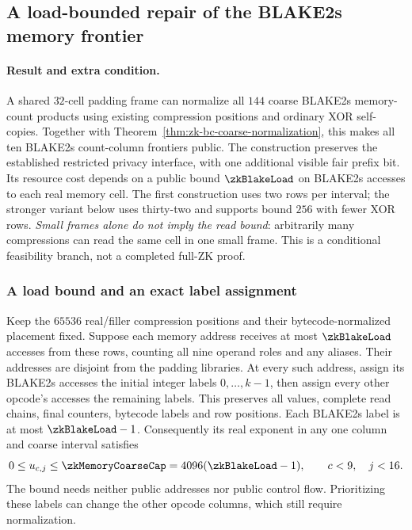 \subsection{A load-bounded repair of the BLAKE2s memory frontier}\label{note:zk-memory-count-coarse}

\paragraph{Result and extra condition.} A shared $32$-cell padding frame can normalize all $144$ coarse BLAKE2s memory-count products using existing compression positions and ordinary XOR self-copies. Together with Theorem~\ref{thm:zk-bc-coarse-normalization}, this makes all ten BLAKE2s count-column frontiers public. The construction preserves the established restricted privacy interface, with one additional visible fair prefix bit. Its resource cost depends on a public bound $\zkBlakeLoad$ on BLAKE2s accesses to each real memory cell. The first construction uses two rows per interval; the stronger variant below uses thirty-two and supports bound $256$ with fewer XOR rows. \emph{Small frames alone do not imply the read bound}: arbitrarily many compressions can read the same cell in one small frame. This is a conditional feasibility branch, not a completed full-ZK proof.

\subsubsection{A load bound and an exact label assignment}

Keep the $65536$ real/filler compression positions and their bytecode-normalized placement fixed. Suppose each memory address receives at most $\zkBlakeLoad$ accesses from these rows, counting all nine operand roles and any aliases. Their addresses are disjoint from the padding libraries. At every such address, assign its BLAKE2s accesses the initial integer labels $0,\ldots,k-1$, then assign every other opcode's accesses the remaining labels. This preserves all values, complete read chains, final counters, bytecode labels and row positions. Each BLAKE2s label is at most $\zkBlakeLoad-1$. Consequently its real exponent in any one column and coarse interval satisfies
\[
 0\le u_{c,j}\le\zkMemoryCoarseCap=4096(\zkBlakeLoad-1),
 \qquad c<9,\quad j<16.
\]
The bound needs neither public addresses nor public control flow. Prioritizing these labels can change the other opcode columns, which still require normalization.

